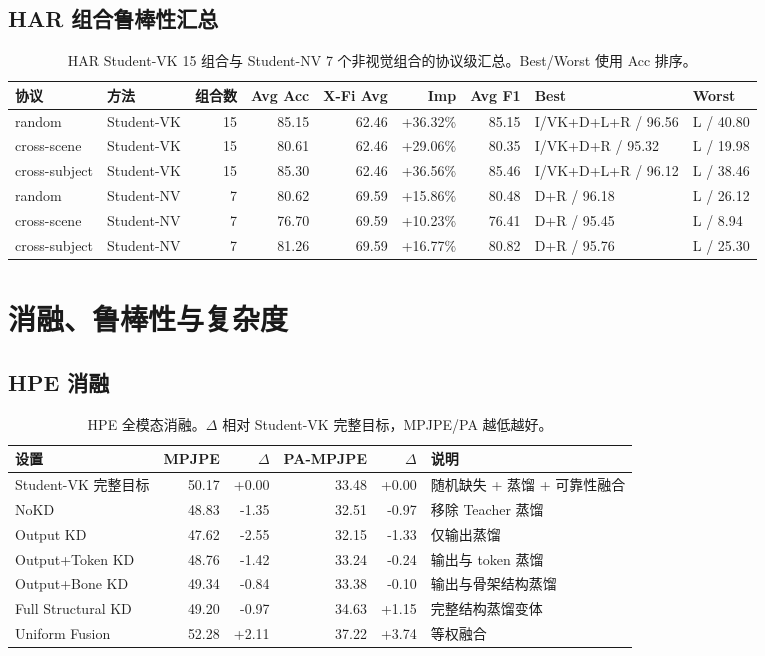 \documentclass[UTF8,10pt]{ctexart}
\newcommand{\better}[1]{\textcolor{goodblue}{#1}}
\newcommand{\worse}[1]{\textcolor{badred}{#1}}
\begin{document}
\subsection{HAR 组合鲁棒性汇总}
\begin{table}[H]\centering\tiny
\caption{HAR Student-VK 15 组合与 Student-NV 7 个非视觉组合的协议级汇总。Best/Worst 使用 Acc 排序。}
\begin{tabular}{llrrrrrll}
\toprule
协议 & 方法 & 组合数 & Avg Acc & X-Fi Avg & Imp & Avg F1 & Best & Worst\\
\midrule
random & Student-VK & 15 & 85.15 & 62.46 & \better{+36.32\%} & 85.15 & I/VK+D+L+R / 96.56 & L / 40.80\\
cross-scene & Student-VK & 15 & 80.61 & 62.46 & \better{+29.06\%} & 80.35 & I/VK+D+R / 95.32 & L / 19.98\\
cross-subject & Student-VK & 15 & 85.30 & 62.46 & \better{+36.56\%} & 85.46 & I/VK+D+L+R / 96.12 & L / 38.46\\
random & Student-NV & 7 & 80.62 & 69.59 & \better{+15.86\%} & 80.48 & D+R / 96.18 & L / 26.12\\
cross-scene & Student-NV & 7 & 76.70 & 69.59 & \better{+10.23\%} & 76.41 & D+R / 95.45 & L / 8.94\\
cross-subject & Student-NV & 7 & 81.26 & 69.59 & \better{+16.77\%} & 80.82 & D+R / 95.76 & L / 25.30\\
\bottomrule
\end{tabular}
\end{table}

\section{消融、鲁棒性与复杂度}
\subsection{HPE 消融}
\begin{table}[H]\centering\scriptsize
\caption{HPE 全模态消融。$\Delta$ 相对 Student-VK 完整目标，MPJPE/PA 越低越好。}
\begin{tabular}{lrrrrp{5.4cm}}
\toprule
设置 & MPJPE & $\Delta$ & PA-MPJPE & $\Delta$ & 说明\\
\midrule
Student-VK 完整目标 & 50.17 & \better{+0.00} & 33.48 & \better{+0.00} & 随机缺失 + 蒸馏 + 可靠性融合\\
NoKD & 48.83 & \better{-1.35} & 32.51 & \better{-0.97} & 移除 Teacher 蒸馏\\
Output KD & 47.62 & \better{-2.55} & 32.15 & \better{-1.33} & 仅输出蒸馏\\
Output+Token KD & 48.76 & \better{-1.42} & 33.24 & \better{-0.24} & 输出与 token 蒸馏\\
Output+Bone KD & 49.34 & \better{-0.84} & 33.38 & \better{-0.10} & 输出与骨架结构蒸馏\\
Full Structural KD & 49.20 & \better{-0.97} & 34.63 & \worse{+1.15} & 完整结构蒸馏变体\\
Uniform Fusion & 52.28 & \worse{+2.11} & 37.22 & \worse{+3.74} & 等权融合\\
\bottomrule
\end{tabular}
\end{table}
\end{document}
